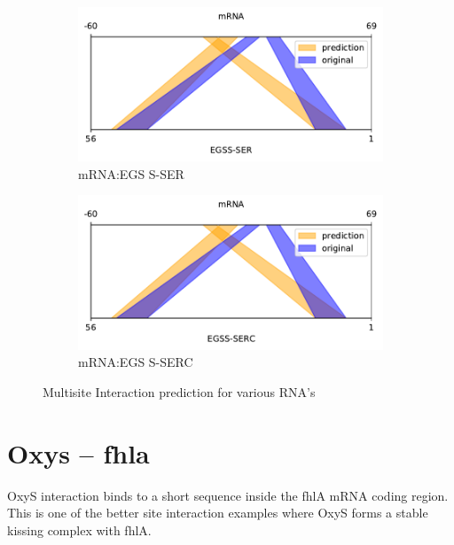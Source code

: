 \documentclass[twoside,a4paper]{report}
\begin{document}
\begin{figure}
\begin{subfigure}{.5\textwidth}
	\centering
	\includegraphics[width=.9\linewidth]{rricomparison7}
	\caption{mRNA:EGS S-SER}
	\label{fig:rricomparison7}
\end{subfigure}%
\begin{subfigure}{.5\textwidth}
	\centering
	\includegraphics[width=.9\linewidth]{rricomparison8}
	\caption{mRNA:EGS S-SERC}
	\label{fig:rricomparison8}
\end{subfigure}%

		\caption{Multisite Interaction prediction for various RNA's}
		\label{fig:test}
			
	\end{figure}

\clearpage		
	\section{Oxys – fhla}
	
	OxyS interaction binds to a short sequence inside the fhlA mRNA coding region. This is one of the better site interaction examples where OxyS forms a stable kissing complex with fhlA. \\
\end{document}
